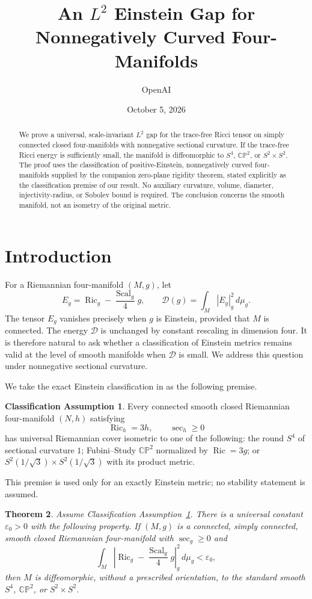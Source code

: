 \documentclass[11pt]{article}
\title{An $L^2$ Einstein Gap for\\Nonnegatively Curved Four-Manifolds}
\author{OpenAI}
\date{October 5, 2026}
\newtheorem{theorem}{Theorem}[section]
\theoremstyle{definition}
\newtheorem{assumption}[theorem]{Classification Assumption}
\theoremstyle{remark}
\numberwithin{equation}{section}
\DeclareMathOperator{\Ric}{Ric}
\DeclareMathOperator{\Scal}{Scal}
\newcommand{\CP}{\mathbb{CP}}
\begin{document}
\maketitle
\begin{abstract}
We prove a universal, scale-invariant $L^2$ gap for the trace-free Ricci
tensor on simply connected closed four-manifolds with nonnegative
sectional curvature. If the trace-free Ricci energy is sufficiently
small, the manifold is diffeomorphic to $S^4$, $\CP^2$, or
$S^2\times S^2$. The proof uses the classification of positive-Einstein,
nonnegatively curved four-manifolds supplied by the companion
zero-plane rigidity theorem, stated explicitly as the classification
premise of our result. No auxiliary curvature, volume, diameter,
injectivity-radius, or Sobolev bound is required. The conclusion concerns
the smooth manifold, not an isometry of the original metric.
\end{abstract}

\section{Introduction}
\label{sec:intro}

For a Riemannian four-manifold $(M,g)$, let
\[
 E_g=\Ric_g-\frac{\Scal_g}{4}g,
 \qquad \mathcal D(g)=\int_M |E_g|_g^2\,d\mu_g.
\]
The tensor $E_g$ vanishes precisely when $g$ is Einstein, provided that
$M$ is connected. The energy $\mathcal D$ is unchanged by constant
rescaling in dimension four. It is therefore natural to ask whether a
classification of Einstein metrics remains valid at the level of smooth
manifolds when $\mathcal D$ is small. We address this question under
nonnegative sectional curvature.

We take the exact Einstein classification in
\cite[Corollary~1.2]{ZeroPlane} as the following premise.

\begin{assumption}\label{ass:classification}
Every connected smooth closed Riemannian four-manifold $(N,h)$ satisfying
\[
 \Ric_h=3h,\qquad \sec_h\ge0
\]
has universal Riemannian cover isometric to one of the following:
the round $S^4$ of sectional curvature $1$; Fubini--Study $\CP^2$ normalized
by $\Ric=3g$; or
$S^2(1/\sqrt3)\times S^2(1/\sqrt3)$ with its product metric.
\end{assumption}

This premise is used only for an exactly Einstein metric; no stability
statement is assumed.

\begin{theorem}\label{thm:gap}
Assume Classification Assumption~\ref{ass:classification}. There is a
universal constant $\varepsilon_0>0$ with the following property.
If $(M,g)$ is a connected, simply connected, smooth closed Riemannian
four-manifold with $\sec_g\ge0$ and
\[
 \int_M\left|\Ric_g-\frac{\Scal_g}{4}g\right|_g^2\,d\mu_g
 <\varepsilon_0,
\]
then $M$ is diffeomorphic, without a prescribed orientation, to the
standard smooth $S^4$, $\CP^2$, or $S^2\times S^2$.
\end{theorem}
\end{document}
